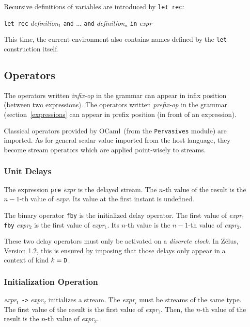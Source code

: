 \documentclass[11pt,titlepage,twoside]{report}
\newcommand{\zelus}{{\sf Z\'elus}}
\newcommand{\ocaml}{{\sf OCaml}}
\newcommand{\Let}{\mbox{{\tt let}}}
\newcommand{\Rec}{\mbox{{\tt rec}}}
\newcommand{\In}{\mbox{{\tt in}}}
\newcommand{\And}{\mbox{{\tt and}}}
\newcommand{\Pre}{\mbox{{\tt pre}}}
\newcommand{\Fby}{\mbox{{\tt fby}}}
\newcommand{\Minusgreater}{\mbox{{\tt ->}}}
\newcommand{\term}[1]{{\tt #1}}
\newcommand{\nterm}[1]{{\em #1}}
\begin{document}
Recursive definitions of variables are introduced by \term{\Let\ \Rec}:
\begin{center}
  \term{\Let\ \Rec} \nterm{definition}$_1$ \term{\And} ... 
  \term{\And} \nterm{definition}$_n$ \term{\In} \nterm{expr}
\end{center}

This time, the current environment also contains names defined by the \term{\Let}
construction itself.

\subsection{Operators}
The operators written \nterm{infix-op} in the grammar can appear in
infix position (between two expressions). The operators written
\nterm{prefix-op} in the grammar (section~\ref{expressions} can appear
in prefix position (in front of an expression).

Classical operators provided by \ocaml\ (from the {\tt Pervasives}
module) are imported. As for general scalar value imported from the
host language, they become stream operators which are applied
point-wisely to streams.

\subsubsection{Unit Delays}
The expression \term{\Pre} \nterm{expr} is the delayed
stream. The $n$-th value of the result is the $n-1$-th
value of \nterm{expr}. Its value at the first instant is undefined.

The binary operator \term{\Fby} is the initialized delay operator. The
first value of \nterm{expr}$_1$ \term{\Fby} \nterm{expr}$_2$ is the
first value of \nterm{expr}$_1$. Its $n$-th value is the $n-1$-th
value of \nterm{expr}$_2$.

These two delay operators must only be activated on a \emph{discrete clock}. In
\zelus, Version 1.2, this is ensured by imposing that those delays only
appear in a context of kind $k = \mathtt{D}$.

\subsubsection{Initialization Operation}
\nterm{expr}$_1$ \term{\Minusgreater} \nterm{expr}$_2$ initializes a
stream. The \nterm{expr}$_i$ must be streams of the same type. The
first value of the result is the first value of
\nterm{expr}$_1$. Then, the $n$-th value of the result is the $n$-th
value of \nterm{expr}$_2$.
\end{document}
